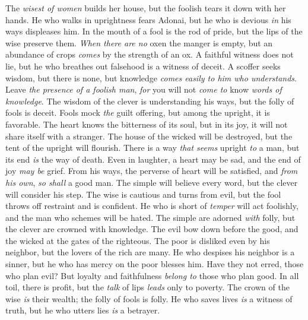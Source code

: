 \begin{biblechapter} %
\verse The \textit{wisest of women} builds her house, 
but the foolish tears it down with her hands.
\verse He who walks in uprightness fears Adonai, 
but he who is devious \textit{in} his ways displeases him.
\verse In the mouth of a fool is the rod of pride, 
but the lips of the wise preserve them.
\verse \textit{When there are no} oxen the manger is empty, 
but an abundance of crops \textit{comes} by the strength of an ox.
\verse A faithful witness does not lie, 
but he who breathes out falsehood is a witness of deceit.
\verse A scoffer seeks wisdom, but there is none, 
but knowledge \textit{comes easily to him who understands}.
\verse Leave \textit{the presence of a foolish man}, 
\textit{for} you will not \textit{come to} know \textit{words of knowledge}.
\verse The wisdom of the clever is understanding his ways, 
but the folly of fools is deceit.
\verse Fools mock \textit{the} guilt offering, 
but among the upright, it is favorable.
\verse The heart knows the bitterness of its soul, 
but in its joy, it will not share itself with a stranger.
\verse The house of the wicked will be destroyed, 
but the tent of the upright will flourish.
\verse There is a way \textit{that seems} upright \textit{to} a man, 
but its end \textit{is} the way of death.
\verse Even in laughter, a heart may be sad, 
and the end of joy \textit{may be} grief.
\verse From his ways, the perverse of heart will be satisfied, 
and \textit{from his own}, \textit{so shall} a good man.
\verse The simple will believe every word, 
but the clever will consider his step.
\verse The wise is cautious and turns from evil, 
but the fool throws off restraint and is confident.
\verse He who is short of \textit{temper} will act foolishly, 
and the man who schemes will be hated.
\verse The simple are adorned \textit{with} folly, 
but the clever are crowned with knowledge.
\verse The evil bow down before the good, 
and the wicked at the gates of the righteous.
\verse The poor is disliked even by his neighbor, 
but the lovers of the rich are many.
\verse He who despises his neighbor is a sinner, 
but he who has mercy on the poor blesses him.
\verse Have they not erred, those who plan evil? 
But loyalty and faithfulness \textit{belong to} those who plan good.
\verse In all toil, there is profit, 
but the \textit{talk} of lips \textit{leads} only to poverty.
\verse The crown of the wise \textit{is} their wealth; 
the folly of fools is folly.
\verse He who saves lives \textit{is} a witness of truth, 
but he who utters lies \textit{is} a betrayer.

\end{biblechapter}
